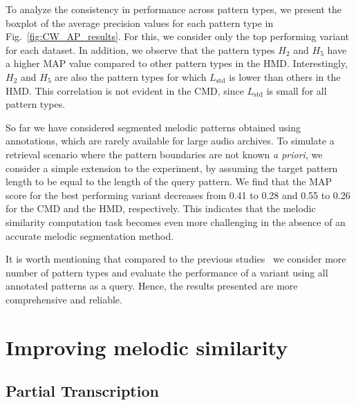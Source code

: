 To analyze the consistency in performance across pattern types, we present the boxplot of the average precision values for each pattern type in Fig.~\ref{fig:CW_AP_results}. For this, we consider only the top performing variant for each dataset.   In addition, we observe that the pattern types $H_2$ and $H_5$ have a higher MAP value compared to other pattern types in the HMD. Interestingly, $H_2$ and $H_5$ are also the pattern types for which $L_{\mathrm{std}}$ is lower than others in the HMD. This correlation is not evident in the CMD, since $L_{\mathrm{std}}$ is small for all pattern types. 

So far we have considered segmented melodic patterns obtained using annotations, which are rarely available for large audio archives. To simulate a retrieval scenario where the pattern boundaries are not known \textit{a priori}, we consider a simple extension to the experiment, by assuming the target pattern length to be equal to the length of the query pattern. We find that the MAP score for the best performing variant decreases from 0.41 to 0.28 and 0.55 to 0.26 for the CMD and the HMD, respectively. This indicates that the melodic similarity computation task becomes even more challenging in the absence of an accurate melodic segmentation method.





It is worth mentioning that compared to the previous studies~\cite{Ishwar2013, Ross2012b} we consider more number of pattern types and evaluate the performance of a variant using all annotated patterns as a query. Hence, the results presented are more comprehensive and reliable.

\section{Improving melodic similarity}

\subsection{Partial Transcription}
\label{partial_transcription}

